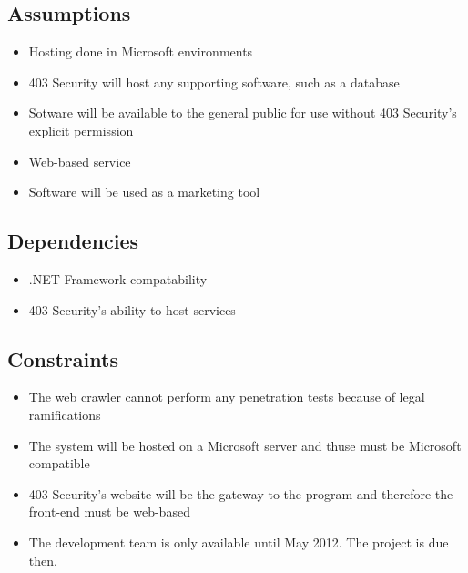 \subsection{Assumptions}
\begin{itemize}
    \item Hosting done in Microsoft environments
    \item 403 Security will host any supporting software, such as a database
    \item Sotware will be available to the general public for use without 403 Security's explicit permission
    \item Web-based service
    \item Software will be used as a marketing tool
\end{itemize}

\subsection{Dependencies}
\begin{itemize}
    \item .NET Framework compatability
    \item 403 Security's ability to host services
\end{itemize}

\subsection{Constraints}
\begin{itemize}
    \item The web crawler cannot perform any penetration tests because of legal ramifications
    \item The system will be hosted on a Microsoft server and thuse must be Microsoft compatible
    \item 403 Security's website will be the gateway to the program and therefore the front-end must be web-based
    \item The development team is only available until May 2012.  The project is due then.
\end{itemize}
